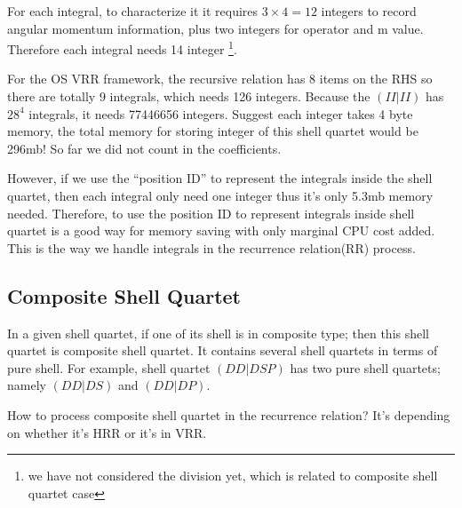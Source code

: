 For each integral, to characterize it it requires $3\times 4 = 12$
integers to record angular momentum information, plus two integers
for operator and m value. Therefore each integral needs 14 integer
\footnote{we have not considered the division yet, which is related to
composite shell quartet case}.

For the OS VRR framework, the recursive relation has 8 items on the 
RHS so there are totally 9 integrals, which needs 126 integers. 
Because the $(II|II)$ has $28^4$ integrals, it needs 77446656 integers.
Suggest each integer takes 4 byte memory, the total memory for 
storing integer of this shell quartet would be 296mb! So far we did not
count in the coefficients.

However, if we use the ``position ID'' to represent the integrals 
inside the shell quartet, then each integral only need one integer 
thus it's only 5.3mb memory needed. Therefore, to use the position 
ID to represent integrals inside shell quartet is a good way for 
memory saving with only marginal CPU cost added. This is the way
we handle integrals in the recurrence relation(RR) process.

\subsection{Composite Shell Quartet}
%
%
\label{composite_shell_quartet}

In a given shell quartet, if one of its shell is in composite type; 
then this shell quartet is composite shell quartet. It contains
several shell quartets in terms of pure shell. For example,
shell quartet $(DD|DSP)$ has two pure shell quartets; namely 
$(DD|DS)$ and $(DD|DP)$.

How to process composite shell quartet in the recurrence relation?
It's depending on whether it's HRR or it's in VRR.

